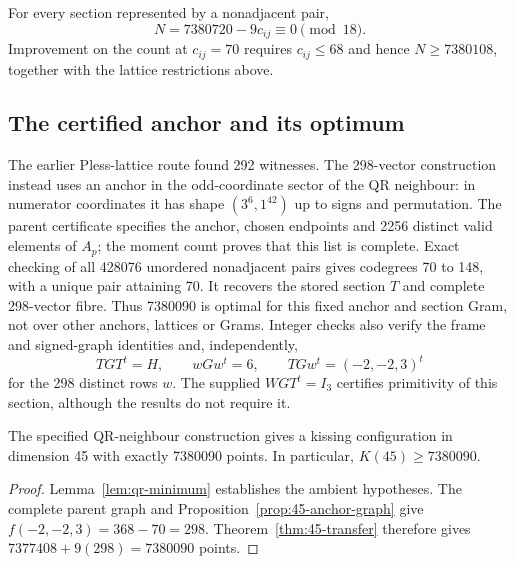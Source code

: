 For every section represented by a nonadjacent pair,
\begin{equation}\label{eq:45-count-congruence}
N=7380720-9c_{ij}\equiv0\pmod{18}.
\end{equation}
Improvement on the count at $c_{ij}=70$ requires $c_{ij}\le68$
and hence $N\ge7380108$, together with the lattice restrictions above.

\subsection{The certified anchor and its optimum}
The earlier Pless-lattice route found 292 witnesses. The 298-vector
construction instead uses an anchor in the odd-coordinate sector of
the QR neighbour: in numerator coordinates it has shape
$(3^6,1^{42})$ up to signs and permutation. The parent certificate
specifies the anchor, chosen endpoints and 2256 distinct valid
elements of $A_p$; the moment count proves that this list is complete.
Exact checking of all 428076 unordered nonadjacent pairs gives codegrees
70 to 148, with a unique pair attaining 70. It recovers the stored
section $T$ and complete 298-vector fibre. Thus 7380090 is optimal for
this fixed anchor and section Gram, not over other anchors, lattices or
Grams. Integer checks also verify the frame and signed-graph identities
and, independently,
\[
TGT^t=H,\qquad wGw^t=6,\qquad TGw^t=(-2,-2,3)^t
\]
for the 298 distinct rows $w$. The supplied $WGT^t=I_3$ certifies
primitivity of this section, although the results do not require it.

\begin{corollary}\label{thm:d45}
The specified QR-neighbour construction gives a kissing configuration
in dimension 45 with exactly 7380090 points. In particular,
$K(45)\ge7380090$.
\end{corollary}
\begin{proof}
Lemma~\ref{lem:qr-minimum} establishes the ambient hypotheses.
The complete parent graph and Proposition~\ref{prop:45-anchor-graph}
give $f(-2,-2,3)=368-70=298$.
Theorem~\ref{thm:45-transfer} therefore gives
$7377408+9(298)=7380090$ points.
\end{proof}
